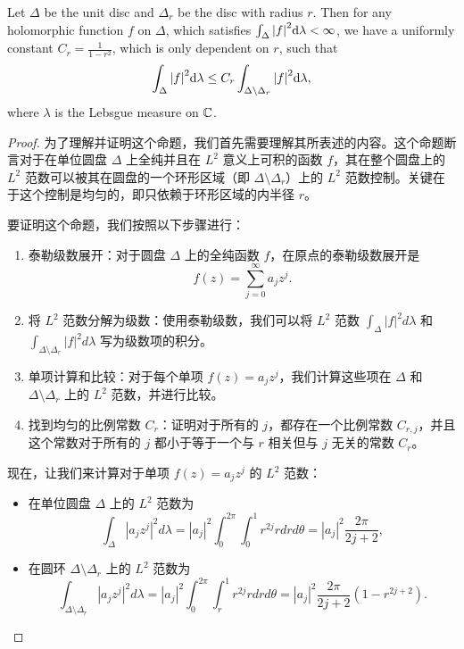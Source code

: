 \begin{lem}
Let $\Delta$ be the unit disc and $\Delta_r$ be the disc with radius $r$. Then for any holomorphic function $f$ on $\Delta$, which satisfies $\int_\Delta \abs{f}^2 \dd \lambda<\infty$, we have a uniformly constant $C_r=\frac{1}{1-r^2}$, which is only dependent on $r$, such that \[\int_\Delta \abs{f}^2\dd \lambda\leq C_r \int_{\Delta\backslash \Delta_r}\abs{f}^2\dd \lambda,\]
where $\lambda$ is the Lebsgue measure on ${\mathbb C}$.
\end{lem}
\begin{proof}
  
为了理解并证明这个命题，我们首先需要理解其所表述的内容。这个命题断言对于在单位圆盘 \(\Delta\) 上全纯并且在 \(L^2\) 意义上可积的函数 \(f\)，其在整个圆盘上的 \(L^2\) 范数可以被其在圆盘的一个环形区域（即 \(\Delta \setminus \Delta_r\)）上的 \(L^2\) 范数控制。关键在于这个控制是均匀的，即只依赖于环形区域的内半径 \(r\)。

要证明这个命题，我们按照以下步骤进行：
\begin{enumerate}
  \item 泰勒级数展开：对于圆盘 \(\Delta\) 上的全纯函数 \(f\)，在原点的泰勒级数展开是 \[f(z) = \sum_{j=0}^{\infty} a_j z^j.\]
  \item 将 \(L^2\) 范数分解为级数：使用泰勒级数，我们可以将 \(L^2\) 范数 \(\int_\Delta |f|^2 d\lambda\) 和 \(\int_{\Delta \setminus \Delta_r} |f|^2 d\lambda\) 写为级数项的积分。
  \item 单项计算和比较：对于每个单项 \(f(z) = a_j z^j\)，我们计算这些项在 \(\Delta\) 和 \(\Delta \setminus \Delta_r\) 上的 \(L^2\) 范数，并进行比较。
  \item 找到均匀的比例常数 \(C_r\)：证明对于所有的 \(j\)，都存在一个比例常数 \(C_{r,j}\)，并且这个常数对于所有的 \(j\) 都小于等于一个与 \(r\) 相关但与 \(j\) 无关的常数 \(C_r\)。
\end{enumerate}


现在，让我们来计算对于单项 \(f(z) = a_j z^j\) 的 \(L^2\) 范数：
\begin{itemize}
  \item 在单位圆盘 \(\Delta\) 上的 \(L^2\) 范数为 \[\int_\Delta |a_j z^j|^2 d\lambda = |a_j|^2 \int_0^{2\pi} \int_0^1 r^{2j} r dr d\theta = |a_j|^2 \frac{2\pi}{2j+2},\]
  \item 在圆环 \(\Delta \setminus \Delta_r\) 上的 \(L^2\) 范数为 \[\int_{\Delta \setminus \Delta_r} |a_j z^j|^2 d\lambda = |a_j|^2 \int_0^{2\pi} \int_r^1 r^{2j} r dr d\theta = |a_j|^2 \frac{2\pi}{2j+2}(1-r^{2j+2}).\]
\end{itemize}



\end{proof}
